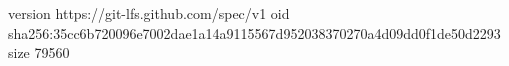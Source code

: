 version https://git-lfs.github.com/spec/v1
oid sha256:35cc6b720096e7002dae1a14a9115567d952038370270a4d09dd0f1de50d2293
size 79560
